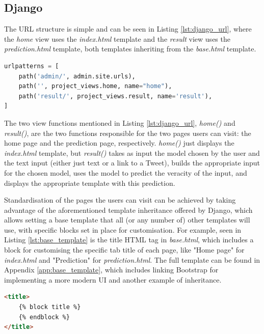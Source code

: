 \documentclass{l4proj}
\begin{document}
\subsection{Django}

The URL structure is simple and can be seen in Listing \ref{lst:django_url}, where the \textit{home} view uses the \textit{index.html} template and the \textit{result} view uses the \textit{prediction.html} template, both templates inheriting from the \textit{base.html} template.

\begin{lstlisting}[language=python, float, caption={The entire list of pages accessible on the Django-made website.}, label=lst:django_url]
urlpatterns = [
    path('admin/', admin.site.urls),
    path('', project_views.home, name="home"),
    path('result/', project_views.result, name='result'),
]
\end{lstlisting}

The two view functions mentioned in Listing \ref{lst:django_url}, \textit{home()} and \textit{result()}, are the two functions responsible for the two pages users can visit: the home page and the prediction page, respectively. \textit{home()} just displays the \textit{index.html} template, but \textit{result()} takes as input the model chosen by the user and the text input (either just text or a link to a Tweet), builds the appropriate input for the chosen model, uses the model to predict the veracity of the input, and displays the appropriate template with this prediction. 

Standardisation of the pages the users can visit can be achieved by taking advantage of the aforementioned template inheritance offered by Django, which allows setting a base template that all (or any number of) other templates will use, with specific blocks set in place for customisation. For example, seen in Listing \ref{lst:base_template} is the title HTML tag in \textit{base.html}, which includes a block for customising the specific tab title of each page, like "Home page" for \textit{index.html} and "Prediction" for \textit{prediction.html}. The full template can be found in Appendix \ref{app:base_template}, which includes linking Bootstrap for implementing a more modern UI and another example of inheritance.

\begin{lstlisting}[language=HTML, float, caption={Using Django template inheritance in {\normalfont base.html} to have a standardised interface between the two available templates.}, label=lst:base_template]
<title>
    {% block title %}
    {% endblock %}
</title>

\end{lstlisting}
\end{document}
